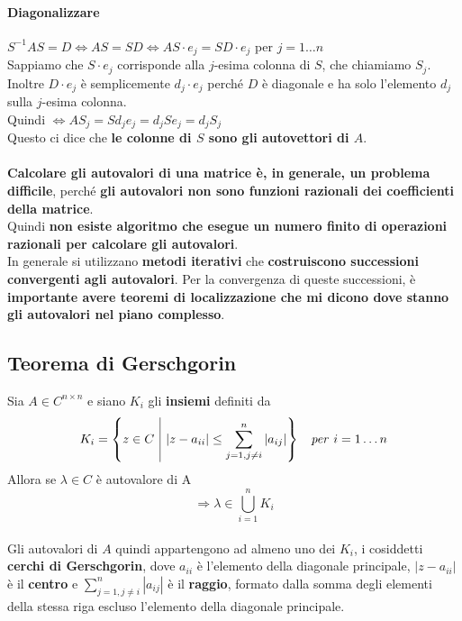 \documentclass[10pt]{book}
\begin{document}
\paragraph{Diagonalizzare}
$S^{-1}AS = D \Leftrightarrow AS = SD \Leftrightarrow AS\cdot e_j = SD\cdot e_j$ per $j = 1 \ldots n$\\
Sappiamo che $S\cdot e_j$ corrisponde alla $j$-esima colonna di $S$, che chiamiamo $S_j$. Inoltre $D\cdot e_j$ è semplicemente $d_j\cdot e_j$ perché $D$ è diagonale e ha solo l'elemento $d_j$ sulla $j$-esima colonna.\\
Quindi $\Leftrightarrow AS_j = Sd_j e_j = d_j S e_j = d_j S_j$\\
Questo ci dice che \textbf{le colonne di $S$ sono gli autovettori di $A$}.\\\\
\textbf{Calcolare gli autovalori di una matrice è, in generale, un problema difficile}, perché \textbf{gli autovalori non sono funzioni razionali dei coefficienti della matrice}.\\
Quindi \textbf{non esiste algoritmo che esegue un numero finito di operazioni razionali per calcolare gli autovalori}.\\
In generale si utilizzano \textbf{metodi iterativi} che \textbf{costruiscono successioni convergenti agli autovalori}. Per la convergenza di queste successioni, è \textbf{importante avere teoremi di localizzazione che mi dicono dove stanno gli autovalori nel piano complesso}.
\subsection{Teorema di Gerschgorin}
Sia $A \in C^{n \times n}$ e siano $K_i$ gli \textbf{insiemi} definiti da $$K_i = \left\{z \in C \:\:\vline\:\: |z-a_{ii}| \leq \sum_{j = 1, j \neq i}^n |a_{ij}|\right\}\:\:\:\:\textit{per}\:\:i = 1 \ldots n$$ Allora se $\lambda \in C$ è autovalore di A $$\Rightarrow \lambda \in \bigcup_{i = 1}^n K_i$$\\
Gli autovalori di $A$ quindi appartengono ad almeno uno dei $K_i$, i cosiddetti \textbf{cerchi di Gerschgorin}, dove $a_{ii}$ è l'elemento della diagonale principale, $|z - a_{ii}|$ è il \textbf{centro} e $\sum_{j = 1, j \neq i}^n |a_{ij}|$ è il \textbf{raggio}, formato dalla somma degli elementi della stessa riga escluso l'elemento della diagonale principale.
\end{document}
